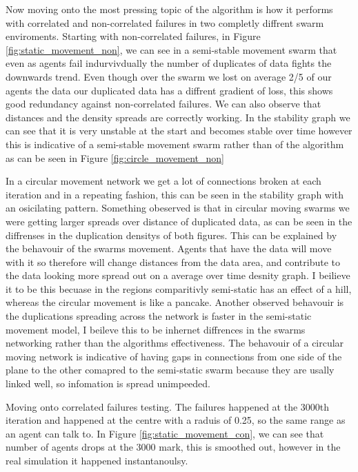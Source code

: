 \documentclass{UoYCSproject}
\begin{document}
Now moving onto the most pressing topic of the algorithm is how it performs with correlated and non-correlated failures in two completly diffrent swarm enviroments.
Starting with non-correlated failures, in Figure \ref{fig:static_movement_non}, we can see in a semi-stable movement swarm that even as agents fail indurvivdually the number of duplicates of data fights the downwards trend.
Even though over the swarm we lost on average 2/5 of our agents the data our duplicated data has a diffrent gradient of loss, this shows good redundancy against non-correlated failures.
We can also observe that distances and the density spreads are correctly working.
In the stability graph we can see that it is very unstable at the start and becomes stable over time however this is indicative of a semi-stable movement swarm rather than of the algorithm as can be seen in Figure \ref{fig:circle_movement_non}

In  a circular movement network we get a lot of connections broken at each iteration and in a repeating fashion, this can be seen in the stability graph with an osicilating pattern.
Something obeserved is that in circular moving swarms we were getting larger spreads over distance of duplicated data, as can be seen in the diffrenses in the duplication densitys of both figures.
This can be explained by the behavouir of the swarms movement.
Agents that have the data will move with it so therefore will change distances from the data area, and contribute to the data looking more spread out on a average over time desnity graph.
I beilieve it to be this becuase in the regions comparitivly semi-static has an effect of a hill, whereas the circular movement is like a pancake.
Another observed behavouir is the duplications spreading across the network is faster in the semi-static movement model, I beileve this to be inhernet diffrences in the swarms networking rather than the algorithms effectiveness.
The behavouir of a circular moving network is indicative of having gaps in connections from one side of the plane to the other comapred to the semi-static swarm because they are usally linked well, so infomation is spread unimpeeded.

Moving onto correlated failures testing.
The failures happened at the 3000th iteration and happened at the centre with a raduis of 0.25, so the same range as an agent can talk to.
In Figure \ref{fig:static_movement_con}, we can see that number of agents drops at the 3000 mark, this is smoothed out, however in the real simulation it happened instantanoulsy.
\end{document}
